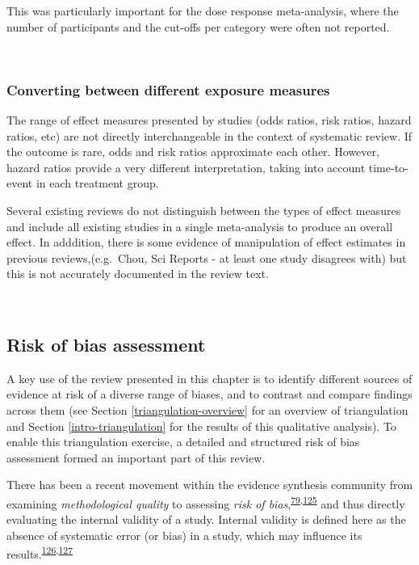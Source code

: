 \documentclass[a4paper, twoside]{templates/ociamthesis}
\begin{document}
This was particularly important for the dose response meta-analysis, where the number of participants and the cut-offs per category were often not reported.

~

\hypertarget{converting-between-different-exposure-measures}{%
\subsubsection{Converting between different exposure measures}\label{converting-between-different-exposure-measures}}

The range of effect measures presented by studies (odds ratios, risk ratios, hazard ratios, etc) are not directly interchangeable in the context of systematic review. If the outcome is rare, odds and risk ratios approximate each other. However, hazard ratios provide a very different interpretation, taking into account time-to-event in each treatment group.

Several existing reviews do not distinguish between the types of effect measures and include all existing studies in a single meta-analysis to produce an overall effect. In adddition, there is some evidence of manipulation of effect estimates in previous reviews,(e.g.~Chou, Sci Reports - at least one study disagrees with) but this is not accurately documented in the review text.

~

\hypertarget{risk-of-bias}{%
\subsection{Risk of bias assessment}\label{risk-of-bias}}

A key use of the review presented in this chapter is to identify different sources of evidence at risk of a diverse range of biases, and to contrast and compare findings across them (see Section \ref{triangulation-overview} for an overview of triangulation and Section \ref{intro-triangulation} for the results of this qualitative analysis). To enable this triangulation exercise, a detailed and structured risk of bias assessment formed an important part of this review.

There has been a recent movement within the evidence synthesis community from examining \emph{methodological quality} to assessing \emph{risk of bias},\textsuperscript{\protect\hyperlink{ref-mcguinness2018}{79},\protect\hyperlink{ref-sterne2016}{125}} and thus directly evaluating the internal validity of a study. Internal validity is defined here as the absence of systematic error (or bias) in a study, which may influence its results.\textsuperscript{\protect\hyperlink{ref-campbell1957}{126},\protect\hyperlink{ref-juni2001}{127}}
\end{document}
